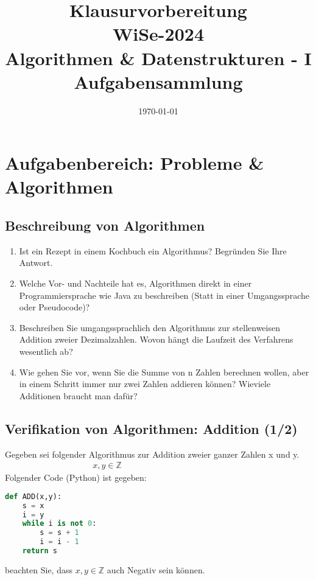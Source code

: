 \documentclass{article}
\title{
    Klausurvorbereitung \\
    WiSe-2024 \\
    Algorithmen \& Datenstrukturen - I \\
    Aufgabensammlung
}
\date{\today}
\begin{document}
\maketitle
\newpage
\tableofcontents
\newpage
\section{Aufgabenbereich: Probleme \& Algorithmen}
\subsection{Beschreibung von Algorithmen}
\begin{enumerate}
    \item Ist ein Rezept in einem Kochbuch ein Algorithmus? Begründen Sie Ihre Antwort.
    \item Welche Vor- und Nachteile hat es, Algorithmen direkt in einer Programmiersprache wie Java zu beschreiben (Statt in einer Umgangssprache oder Pseudocode)?
    \item Beschreiben Sie umgangssprachlich den Algorithmus zur stellenweisen Addition zweier Dezimalzahlen. Wovon hängt die Laufzeit des Verfahrens wesentlich ab?
    \item Wie gehen Sie vor, wenn Sie die Summe von n Zahlen berechnen wollen, aber in einem Schritt immer nur zwei Zahlen addieren können? Wieviele Additionen braucht man dafür?
\end{enumerate}
\newpage
\subsection{Verifikation von Algorithmen: Addition (1/2)}
Gegeben sei folgender Algorithmus zur Addition zweier ganzer Zahlen x und y.
\begin{align*}
    x,y \in \mathbb{Z} & & & & & & & & & & & & & & &
\end{align*}
Folgender Code (Python) ist gegeben:
\begin{lstlisting}[language=python]
def ADD(x,y):
    s = x
    i = y
    while i is not 0:
        s = s + 1
        i = i - 1
    return s
\end{lstlisting}
beachten Sie, dass $x,y \in \mathbb{Z}$ auch Negativ sein können.\vspace{2cm}
\end{document}
